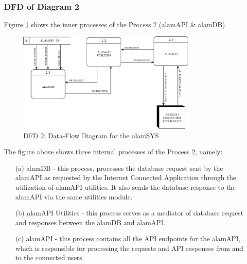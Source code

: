 \subsubsection{DFD of Diagram 2}
\label{subsubsec:dfd2}
Figure \ref{fig:dfd2} shows the inner processes of the Process 2 (alamAPI \& alamDB).
\begin{figure}[ht]
    \centering
    \includegraphics[width=0.80\textwidth]{./assets/Chapter_3/DFD/DFD_2.png}
    \caption{DFD 2: Data-Flow Diagram for the alamSYS}
    \label{fig:dfd2}
\end{figure}
\FloatBarrier
\vspace{0.5cm}
The figure above shows three internal processes of the Process 2, namely:
\begin{itemize}
    \item[(a)] alamDB - this process, processes the database request sent by the alamAPI as requested by the
    Internet Connected Application through the utilization of alamAPI utilities. It also sends the database
    response to the alamAPI via the same utilities module.
    \item[(b)] alamAPI Utilities - this process serves as a mediator of database request and responses
    between the alamDB and alamAPI.
    \item[(c)] alamAPI - this process contains all the API endpoints for the alamAPI, which is responsible
    for processing the requests and API responses from and to the connected users.
\end{itemize}